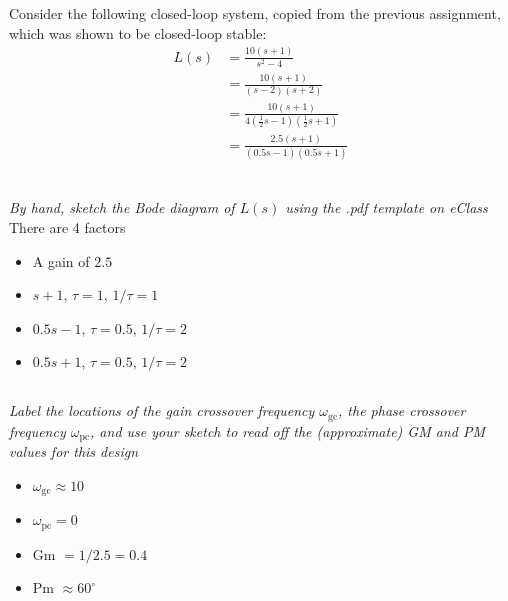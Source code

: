 \FloatBarrier
\section{}
Consider the following closed-loop system, copied from the previous assignment, which
was shown to be closed-loop stable:
\begin{align*}
    L(s) &= \frac{10(s+1)}{s^2 - 4} \\
    &= \frac{10(s+1)}{(s-2)(s+2)} \\
    &=\frac{10(s+1)}{4(\frac{1}{2}s-1)(\frac{1}{2}s+1)} \\
    &= \frac{2.5 (s+1)}{(0.5s-1)(0.5s+1)} \\
\end{align*}

\subsection{}
\textit{By hand, sketch the Bode diagram of $L(s)$ using the .pdf template on eClass}
There are 4 factors
\begin{itemize}
    \item A gain of $2.5$
    \item $s+1$, $\tau = 1$, $1/\tau = 1$
    \item $0.5s-1$, $\tau = 0.5$, $1/\tau = 2$
    \item $0.5s+1$, $\tau = 0.5$, $1/\tau = 2$
\end{itemize}

\subsection{}
\textit{Label the locations of the gain crossover frequency $\omega_{\text{gc}}$, the phase crossover frequency $\omega_{\text{pc}}$,
and use your sketch to read off the (approximate) GM and PM values for this design}



\begin{itemize}
    \item $\omega_{\text{gc}} \approx 10$
    \item $\omega_{\text{pc}} = 0$
    \item Gm $=1/2.5 = 0.4$
    \item Pm $\approx 60^\circ$
\end{itemize}
